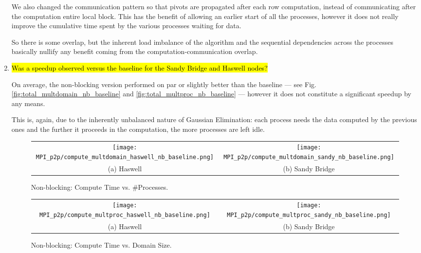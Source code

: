 \begin{enumerate}
	We also changed the communication pattern so that pivots are propagated after each row computation, instead of communicating after the computation entire local block. This has the benefit of allowing an earlier start of all the processes, however it does not really improve the cumulative time spent by the various processes waiting for data.

	So there is some overlap, but the inherent load imbalance of the algorithm and the sequential dependencies across the processes basically nullify any benefit coming from the computation-communication overlap.

	\item \hl{Was a speedup observed versus the baseline for the Sandy Bridge and Haswell nodes?}

	On average, the non-blocking version performed on par or slightly better than the baseline --- see Fig.\ref{fig:total_multdomain_nb_baseline} and \ref{fig:total_multproc_nb_baseline} --- however it does not constitute a significant speedup by any means.

	This is, again, due to the inherently unbalanced nature of Gaussian Elimination: each process needs the data computed by the previous ones and the further it proceeds in the computation, the more processes are left idle.

	\begin{figure}[p] %
		\begin{tabular}{cc}
			\hspace*{-0.35\linewidth}\texttt{[image: MPI\_p2p/compute\_multdomain\_haswell\_nb\_baseline.png]} & \hspace*{-0.05\linewidth}\texttt{[image: MPI\_p2p/compute\_multdomain\_sandy\_nb\_baseline.png]} \\
			\hspace*{-0.45\linewidth}(a) Haswell & \hspace*{-0.15\linewidth}(b) Sandy Bridge\\[6pt]
		\end{tabular}
		\caption{Non-blocking: Compute Time vs. \#Processes.}
		\label{fig:compute_multdomain_nb_baseline}
	\end{figure}
	
	\begin{figure}[p] %
		\begin{tabular}{cc}
			\hspace*{-0.35\linewidth}\texttt{[image: MPI\_p2p/compute\_multproc\_haswell\_nb\_baseline.png]} & \hspace*{-0.05\linewidth}\texttt{[image: MPI\_p2p/compute\_multproc\_sandy\_nb\_baseline.png]} \\
			\hspace*{-0.45\linewidth}(a) Haswell & \hspace*{-0.15\linewidth}(b) Sandy Bridge\\[6pt]
		\end{tabular}
		\caption{Non-blocking: Compute Time vs. Domain Size.}
		\label{fig:compute_multproc_nb_baseline}
	\end{figure}
	

\end{enumerate}
